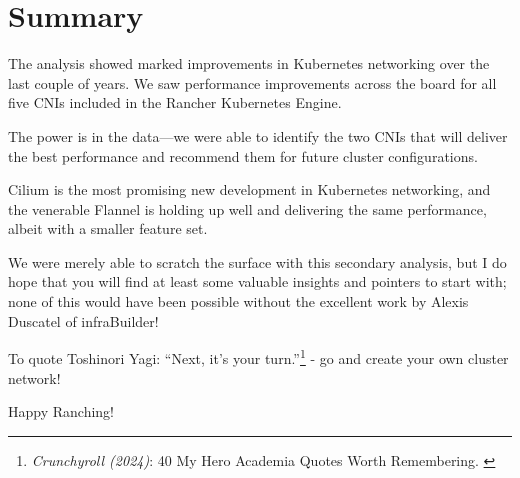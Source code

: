 %
%

\pagebreak
\section{Summary}

\onehalfspacing

The analysis showed marked improvements in Kubernetes networking over the last couple of years. We saw performance improvements across the board for all five CNIs included in the Rancher Kubernetes Engine.

The power is in the data—we were able to identify the two CNIs that will deliver the best performance and recommend them for future cluster configurations.

Cilium is the most promising new development in Kubernetes networking, and the venerable Flannel is holding up well and delivering the same performance, albeit with a smaller feature set.

We were merely able to scratch the surface with this secondary analysis, but I do hope that you will find at least some valuable insights and pointers to start with; none of this would have been possible without the excellent work by Alexis Duscatel of infraBuilder!

To quote Toshinori Yagi: “Next, it’s your turn.”\footnote{\textit{Crunchyroll (2024)}: 40 My Hero Academia Quotes Worth Remembering. \cite{mhaQuotes}} - go and create your own cluster network!

Happy Ranching!
